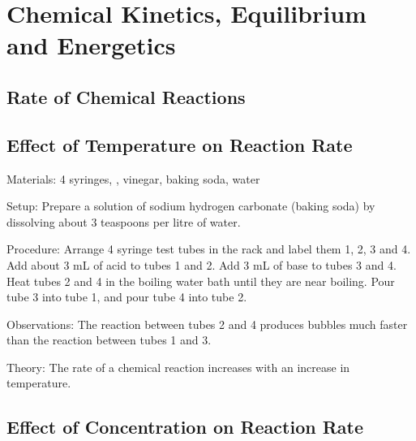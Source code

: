 \section{Chemical Kinetics, Equilibrium and Energetics}

\begin{multicols}{2}


\section*{Rate of Chemical Reactions}


\subsection{Effect of Temperature on Reaction Rate}


\begin{description*}
\item[Materials:]{4 syringes, , vinegar, baking soda, water }
\item[Setup:]{Prepare a solution of sodium hydrogen carbonate (baking soda) by dissolving about 3 teaspoons per litre of water.}
\item[Procedure:]{Arrange 4 syringe test tubes in the rack and label them 1, 2, 3 and 4. Add about 3 mL of acid to tubes 1 and 2. Add 3 mL of base to tubes 3 and 4. Heat tubes 2 and 4 in the boiling water bath until they are near boiling. Pour tube 3 into tube 1, and pour tube 4 into tube 2.}
\item[Observations:]{The reaction between tubes 2 and 4 produces bubbles much faster than the reaction between tubes 1 and 3.}
\item[Theory:]{The rate of a chemical reaction increases with an increase in temperature.}
\end{description*}

\subsection{Effect of Concentration on Reaction Rate} %


\end{multicols}
